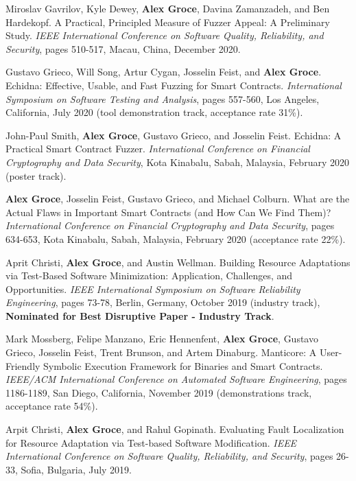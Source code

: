 \documentclass[ComputerScience]{vita}
\begin{document}
\begin{vita}
\begin{Refereed Conference and Workshop Publications}
\item Miroslav Gavrilov, Kyle Dewey, {\bf Alex Groce}, Davina Zamanzadeh,
  and Ben Hardekopf.
\newblock A Practical, Principled Measure of Fuzzer Appeal: A
Preliminary Study.
\newblock \emph{IEEE International Conference on Software
Quality, Reliability, and Security}, pages 510-517, Macau,
China, December 2020.
  
\item Gustavo Grieco, Will Song, Artur Cygan, Josselin Feist, and {\bf
    Alex Groce}.
\newblock Echidna: Effective, Usable, and Fast Fuzzing for Smart Contracts.
\newblock \emph{International Symposium on Software Testing and
  Analysis}, pages 557-560, Los Angeles, California, July
2020 (tool demonstration track, acceptance rate 31\%).
  
\item John-Paul Smith, {\bf Alex Groce}, Gustavo Grieco, and Josselin Feist.
\newblock Echidna: A Practical Smart Contract Fuzzer.
\newblock \emph{International Conference on Financial Cryptography and
  Data Security}, Kota Kinabalu, Sabah,
Malaysia, February 2020 (poster track).
  
\item {\bf Alex Groce}, Josselin Feist, Gustavo Grieco, and Michael Colburn. 
\newblock What are the Actual
Flaws in Important Smart Contracts (and How Can We Find Them)?
\newblock \emph{International Conference on Financial Cryptography and
  Data Security}, pages 634-653, Kota Kinabalu, Sabah, Malaysia, February 2020
(acceptance rate 22\%).

\item Aprit Christi, {\bf Alex Groce}, and Austin Wellman.
\newblock Building Resource Adaptations via Test-Based Software
Minimization: Application, Challenges, and Opportunities.
\newblock \emph{IEEE International Symposium on Software Reliability 
  Engineering}, pages 73-78, Berlin, Germany, October
2019 (industry track), {\bf Nominated for Best Disruptive Paper - Industry Track}.
  
\item Mark Mossberg, Felipe Manzano, Eric Hennenfent, {\bf Alex
    Groce}, Gustavo Grieco, Josselin Feist, Trent Brunson, and Artem Dinaburg.
\newblock Manticore: A User-Friendly Symbolic Execution Framework for Binaries and Smart Contracts.
\newblock \emph{IEEE/ACM International Conference on Automated Software
  Engineering}, pages 1186-1189, San Diego, California,
November 2019 (demonstrations track, acceptance rate 54\%).
  
\item Arpit Christi, {\bf Alex Groce}, and Rahul Gopinath.
\newblock Evaluating Fault Localization for Resource Adaptation via Test-based Software Modification.
\newblock \emph{IEEE International Conference on Software Quality,
  Reliability, and Security}, pages 26-33,
Sofia, Bulgaria, July 2019.


\end{Refereed Conference and Workshop Publications}
\end{vita}
\end{document}
